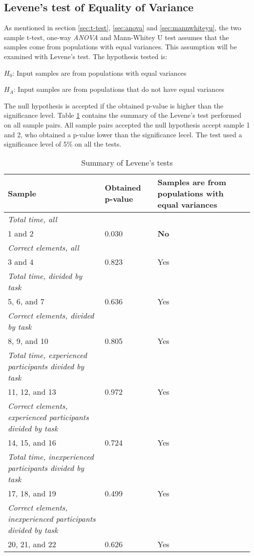\vspace{0.5cm}

\subsection{Levene's test of Equality of Variance}\label{sec:levene_test_results}
As mentioned in section \ref{sec:t-test}, \ref{sec:anova} and \ref{sec:mannwhiteyu}, the two sample t-test, one-way \textit{ANOVA} and Mann-Whitey U test assumes that the samples come from populations with equal variances. This assumption will be examined with Levene's test. The hypothesis tested is: \\[0.3cm]

\centerline{$H_{0}$: Input samples are from populations with equal variances} 
\centerline{$H_{A}$: Input samples are from populations that do not have equal variances}
\vspace{0.3cm}

The null hypothesis is accepted if the obtained p-value is higher than the significance level. Table \ref{tab:levenestest_summary} contains the summary of the Levene's test performed on all sample pairs. All sample pairs accepted the null hypothesis accept sample 1 and 2, who obtained a p-value lower than the significance lecel. The test used a significance level of 5\% on all the tests. \\[0.2cm]

\begin{longtable}{p{}|l|p{}}
	\caption[Summary, Levene's tests]{Summary of Levene's tests} \label{tab:levenestest_summary} \\
	Sample & Obtained p-value & Samples are from populations with equal variances \\ \hline
	\textit{Total time, all} & & \\
	1 and 2 & 0.030 & \textbf{No}  \\ \hline
	\textit{Correct elements, all} & & \\
	3 and 4 &0.823& Yes   \\ \hline
	\textit{Total time, divided by task}& & \\
	5, 6, and 7 & 0.636 & Yes \\ \hline
	\textit{Correct elements, divided by task} & & \\
	8, 9, and 10 & 0.805  & Yes  \\ \hline
	\textit{Total time, experienced participants divided by task} & & \\
	11, 12, and 13 & 0.972 & Yes  \\ \hline
	\textit{Correct elements, experienced participants divided by task} & & \\
	14, 15, and 16 & 0.724 & Yes \\ \hline
	\textit{Total time, inexperienced participants divided by task} & & \\
	17, 18, and 19 & 0.499  & Yes  \\ \hline
	\textit{Correct elements, inexperienced participants divided by task} & & \\
	20, 21, and 22 & 0.626 & Yes \\ \hline
\end{longtable}

